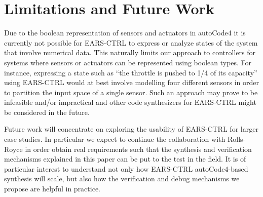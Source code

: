 \section{Limitations and Future Work}
\label{sec:limfuturework}
\vspace{-.3cm}Due to the boolean representation of sensors and actuators in
\textsf{autoCode4} it is currently not possible for \textsf{EARS-CTRL} to express or analyze
states of the system that involve numerical data. This naturally limits our
approach to controllers for systems where sensors or actuators can be
represented using boolean types.
For instance, expressing a state such as ``the throttle is pushed to 1/4 of its
capacity'' using \textsf{EARS-CTRL} would at best involve modelling four
different sensors in order to partition the input space of a single sensor. Such
an approach may prove to be infeasible and/or impractical and other code
synthesizers for \textsf{EARS-CTRL} might be considered in the future.

Future work will concentrate on exploring the usability of
\textsf{EARS-CTRL} for larger case studies. In particular we expect to continue
the collaboration with Rolls-Royce in order obtain real requirements such that
the synthesis and verification mechanisms explained in this paper can be put to
the test in the field. It is of particular interest to understand not only how
\textsf{EARS-CTRL} \textsf{autoCode4}-based synthesis will scale, but also how
the verification and debug mechanisms we propose are helpful in practice.
